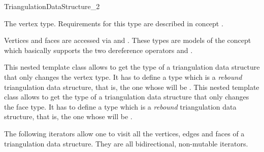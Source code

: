 \begin{ccRefConcept}{TriangulationDataStructure_2}
\ccTypes
{}
\ccThreeToTwo

\ccGlue
{}

 { The vertex type. Requirements for this type
are described in concept 
.}
\ccGlue
{}

Vertices and faces are accessed  via  and
. These types 
are models of the concept  which basically
supports the two dereference operators \ccc{*} and \ccc{->}.

\ccGlue
{}

\begin{ccAdvanced}
{This nested template class allows to get the type of a triangulation
data structure that only changes the vertex type.  It has to define a type
 which is a {\it rebound} triangulation data structure, that is, the
one whose  will be .}
\ccGlue
{}
{This nested template class allows to get the type of a triangulation
data structure that only changes the face type.  It has to define a type
 which is a {\it rebound} triangulation data structure, that is, the
one whose  will be .}
\end{ccAdvanced}




The following iterators allow one to visit all the vertices, edges
and  faces
of a triangulation data structure. They are all
bidirectional, non-mutable iterators.

\ccGlue
{}
\ccGlue
{}



\end{ccRefConcept}
